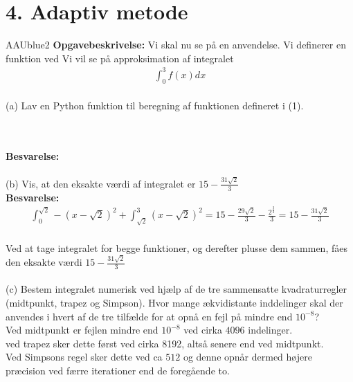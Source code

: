 \section*{4. Adaptiv metode}
% 
%
\begin{color}{AAUblue2}
%
\textbf{Opgavebeskrivelse:} 
Vi skal nu se på en anvendelse. Vi definerer en funktion ved
%
%
Vi vil se på approksimation af integralet 
\begin{align}
\int_{0}^{3}f(x)dx    
\end{align}
\\
(a) Lav en Python funktion til beregning af funktionen defineret i (1).
% 
\end{color}
\\\\
% 
\textbf{Besvarelse:} \\\\
(b) Vis, at den eksakte værdi af integralet er $15-\frac{31\sqrt{2}}{3}$\\
\textbf{Besvarelse:} \\ 
\begin{align*}
\int^{\sqrt{2}}_0-(x-\sqrt{2})^2+\int^3_{\sqrt{2}}(x-\sqrt{2})^2=15-\frac{29\sqrt{2}}{3}-\frac{2^{\frac{3}{2}}}{3}=15-\frac{31\sqrt{2}}{3} 
\end{align*} \\
Ved at tage integralet for begge funktioner, og derefter plusse dem sammen, fåes den eksakte værdi $15-\frac{31\sqrt{2}}{3}$\\\\
(c) Bestem integralet numerisk ved hjælp af de tre sammensatte kvadraturregler
(midtpunkt, trapez og Simpson). Hvor mange ækvidistante inddelinger skal der
anvendes i hvert af de tre tilfælde for at opnå en fejl på mindre end $10^{-8}$?\\
Ved midtpunkt er fejlen mindre end $10^{-8}$ ved cirka $4096$ indelinger.\\
ved trapez sker dette først ved cirka 8192, altså senere end ved midtpunkt.\\ 
Ved Simpsons regel sker dette ved ca $512$ og denne opnår dermed højere præcision ved færre iterationer end de foregående to.

